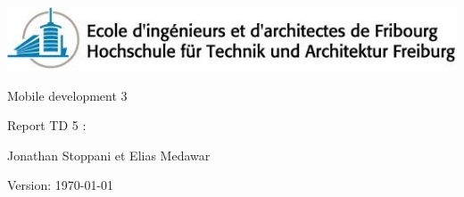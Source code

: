 \begin{titlepage}
	

		
	\addtolength{\leftskip}{-1cm}\addtolength{\rightskip}{-3.5cm}
	\vfill
	
	\hspace{0.10cm}	\includegraphics{./images/model/eifr-logo.jpg} 

	\vfill
	\hspace{8.99cm}\Huge Mobile development  3 
	
	\hspace{9.08cm}\LARGE Report TD 5 : 
	      
	\vfill
	\Large
	
	\hspace{9.08cm}  Jonathan Stoppani et Elias Medawar
	
	\vfill
	\hspace{9.08cm}\normalsize Version:  \today
	\vfill
	\thispagestyle{empty}
	\clearpage

\end{titlepage}
